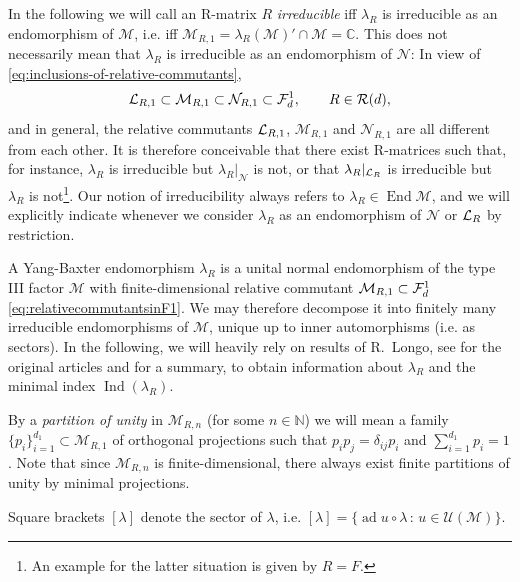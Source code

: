 \documentclass[12pt,a4paper]{amsart}
\numberwithin{equation}{section}
\theoremstyle{remark}
\def\End{\operatorname{End}}
\def\Ind{\operatorname{Ind}}
\DeclareMathOperator{\ad}{ad}
\newcommand{\Cl}{\mathbb{C}}
\newcommand{\Nl}{\mathbb{N}}
\newcommand{\la}{\lambda}
\newcommand{\CM}[0]{\mathcal{M}} \newcommand{\CN}[0]{\mathcal{N}}
\newcommand{\CU}[0]{\mathcal{U}} \newcommand{\CV}[0]{\mathcal{V}}
\begin{document}
In the following we will call an R-matrix $R$ {\em irreducible} iff $\la_R$ is irreducible as an endomorphism of $\CM$, i.e. iff $\CM_{R,1}=\la_R(\CM)'\cap\CM=\Cl$. This does not necessarily mean that $\la_R$ is irreducible as an endomorphism of $\CN$: In view of \eqref{eq:inclusions-of-relative-commutants},
\begin{align}\label{eq:relativecommutantsinF1}
    \CL_{R,1}
    \subset
    \CM_{R,1}
    \subset
    \CN_{R,1}
    \subset
    \CF_d^1,\qquad R\in\CR(d),
\end{align}
and in general, the relative commutants $\mathcal{L}_{R,1}$, $\CM_{R,1}$ and $\CN_{R,1}$ are all different from each other. It is therefore conceivable that there exist R-matrices such that, for instance, $\la_R$ is irreducible but ${\la_R}|_{\CN}$ is not, or that ${\la_R}|_{\CL_R}$ is irreducible but $\la_R$ is not\footnote{An example for the latter situation is given by $R=F$.}. Our notion of irreducibility always refers to $\la_R\in\End\CM$, and we will explicitly indicate whenever we consider $\la_R$ as an endomorphism of $\CN$ or $\mathcal{L}_R$ by restriction.

\medskip

A Yang-Baxter endomorphism $\la_R$ is a unital normal endomorphism of the type III factor $\CM$ with finite-dimensional relative commutant $\CM_{R,1}\subset\CF_d^1$ \eqref{eq:relativecommutantsinF1}. We may therefore decompose it into finitely many irreducible endomorphisms of $\CM$, unique up to inner automorphisms (i.e. as sectors). In the following, we will heavily rely on results of R.~Longo, see \cite{Longo:1989,Longo:1991} for the original articles and \cite{Izumi:1991} for a summary, to obtain information about $\la_R$ and the minimal index $\Ind(\la_R)$. 

By a {\em partition of unity} in $\CM_{R,n}$ (for some $n\in\Nl$) we will mean a family $\{p_i\}_{i=1}^{d_1}\subset\CM_{R,1}$ of orthogonal projections such that $p_{i} p_{j}=\delta_{ij}p_{i}$ and $\sum_{i=1}^{d_1}p_{i}=1$. Note that since $\CM_{R,n}$ is finite-dimensional, there always exist finite partitions of unity by minimal projections.

Square brackets $\left[\la\right]$ denote the sector of $\la$, i.e. $[\la]=\{\ad u\circ\la\,:\,u\in\CU(\CM)\}$.
\end{document}
